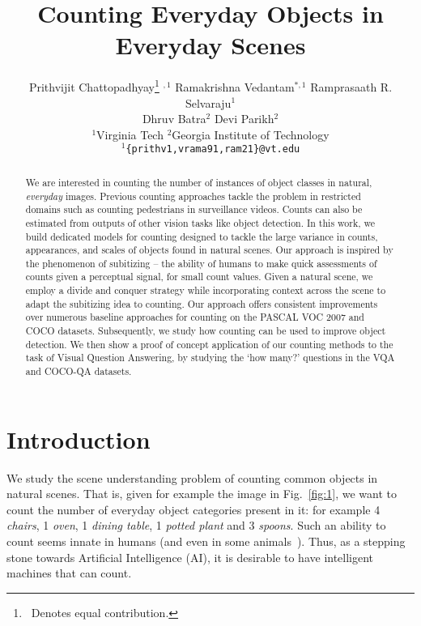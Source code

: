 \documentclass[10pt,twocolumn,letterpaper]{article}
\begin{document}
\title{Counting Everyday Objects in Everyday Scenes}

\author{
    Prithvijit Chattopadhyay\thanks{\,\,\,Denotes equal contribution.}$\,\,^{,1}$ \quad Ramakrishna Vedantam$^{*,1}$ \quad Ramprasaath R. Selvaraju$^{1}$ \\ \quad Dhruv Batra$^2$ \quad Devi Parikh$^2$\\
    $^1$Virginia Tech \quad $^2$Georgia Institute of Technology\\
    {\tt\small $^{1}$\{prithv1,vrama91,ram21\}@vt.edu} \\
}



\maketitle


\begin{abstract}
We are interested in counting the number of instances of object classes in natural, \emph{everyday} images. 
Previous counting approaches tackle the problem in restricted domains such as counting pedestrians in surveillance videos.
Counts can also be estimated from outputs of other vision tasks like object detection. In this work, we build dedicated models for counting designed to tackle the large variance in counts, appearances, and scales of objects found in natural scenes. Our approach is inspired by the phenomenon of subitizing -- the ability of humans to make quick assessments of counts given a perceptual signal, for small count values. Given a natural scene, we employ a divide and conquer strategy while incorporating context across the scene to adapt the subitizing idea to counting. Our approach offers consistent improvements over numerous baseline approaches for counting 
on the PASCAL VOC 2007 and COCO datasets. Subsequently, we study 
how counting can be used to improve object detection. We then show a proof of concept application of our counting methods to the task of Visual Question Answering, by studying the `how many?' questions in the VQA and COCO-QA datasets.
\end{abstract}
\section{Introduction}\label{sec:intro}
We study the scene understanding problem of counting common objects in natural scenes.
That is, given for example the image in Fig.~\ref{fig:1}, we want to count the number of everyday object categories present in it: for example 4 \emph{chairs}, 1 \emph{oven}, 1 \emph{dining table}, 1 \emph{potted plant} and 3 \emph{spoons}. Such an ability to count seems innate in humans (and even in some animals~\cite{CutiniS}). Thus, as a stepping stone towards Artificial Intelligence (AI), it is desirable to have intelligent machines that can count. 
\end{document}
